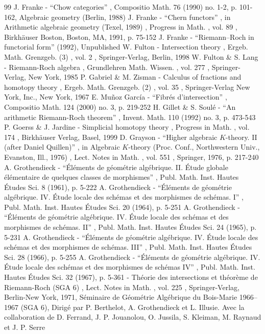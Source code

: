 \documentclass[11pt]{article}
\theoremstyle{plain}
\theoremstyle{definition}
\begin{document}
\begin{thebibliography}{99}
 J. Franke - “Chow categories” , Compositio Math. 76 (1990) no. 1-2, p. 101-162, Algebraic geometry (Berlin, 1988)
 J. Franke - “Chern functors” , in Arithmetic algebraic geometry (Texel, 1989) , Progress in Math. , vol. 89 , Birkhäuser Boston, Boston, MA, 1991, p. 75-152
 J. Franke - “Riemann–Roch in functorial form” (1992), Unpublished
 W. Fulton - Intersection theory , Ergeb. Math. Grenzgeb. (3) , vol. 2 , Springer-Verlag, Berlin, 1998
 W. Fulton \& S. Lang - Riemann-Roch algebra , Grundlehren Math. Wissen. , vol. 277 , Springer-Verlag, New York, 1985
 P. Gabriel \& M. Zisman - Calculus of fractions and homotopy theory , Ergeb. Math. Grenzgeb. (2) , vol. 35 , Springer-Verlag New York, Inc., New York, 1967
 E. Muñoz García - “Fibrés d’intersection” , Compositio Math. 124 (2000) no. 3, p. 219-252
 H. Gillet \& S. Soulé - “An arithmetic Riemann-Roch theorem” , Invent. Math. 110 (1992) no. 3, p. 473-543
 P. Goerss \& J. Jardine - Simplicial homotopy theory , Progress in Math. , vol. 174 , Birkhäuser Verlag, Basel, 1999
 D. Grayson - “Higher algebraic $K$-theory. II (after Daniel Quillen)” , in Algebraic $K$-theory (Proc. Conf., Northwestern Univ., Evanston, Ill., 1976) , Lect. Notes in Math. , vol. 551 , Springer, 1976, p. 217-240
 A. Grothendieck - “Éléments de géométrie algébrique. II. Étude globale élémentaire de quelques classes de morphismes” , Publ. Math. Inst. Hautes Études Sci. 8 (1961), p. 5-222
 A. Grothendieck - “Éléments de géométrie algébrique. IV. Étude locale des schémas et des morphismes de schémas. I” , Publ. Math. Inst. Hautes Études Sci. 20 (1964), p. 5-251
 A. Grothendieck - “Éléments de géométrie algébrique. IV. Étude locale des schémas et des morphismes de schémas. II” , Publ. Math. Inst. Hautes Études Sci. 24 (1965), p. 5-231
 A. Grothendieck - “Éléments de géométrie algébrique. IV. Étude locale des schémas et des morphismes de schémas. III” , Publ. Math. Inst. Hautes Études Sci. 28 (1966), p. 5-255
 A. Grothendieck - “Éléments de géométrie algébrique. IV. Étude locale des schémas et des morphismes de schémas IV” , Publ. Math. Inst. Hautes Études Sci. 32 (1967), p. 5-361
 - Théorie des intersections et théorème de Riemann-Roch (SGA 6) , Lect. Notes in Math. , vol. 225 , Springer-Verlag, Berlin-New York, 1971, Séminaire de Géométrie Algébrique du Bois-Marie 1966–1967 (SGA 6), Dirigé par P. Berthelot, A. Grothendieck et L. Illusie. Avec la collaboration de D. Ferrand, J. P. Jouanolou, O. Jussila, S. Kleiman, M. Raynaud et J. P. Serre

\end{thebibliography}
\end{document}
